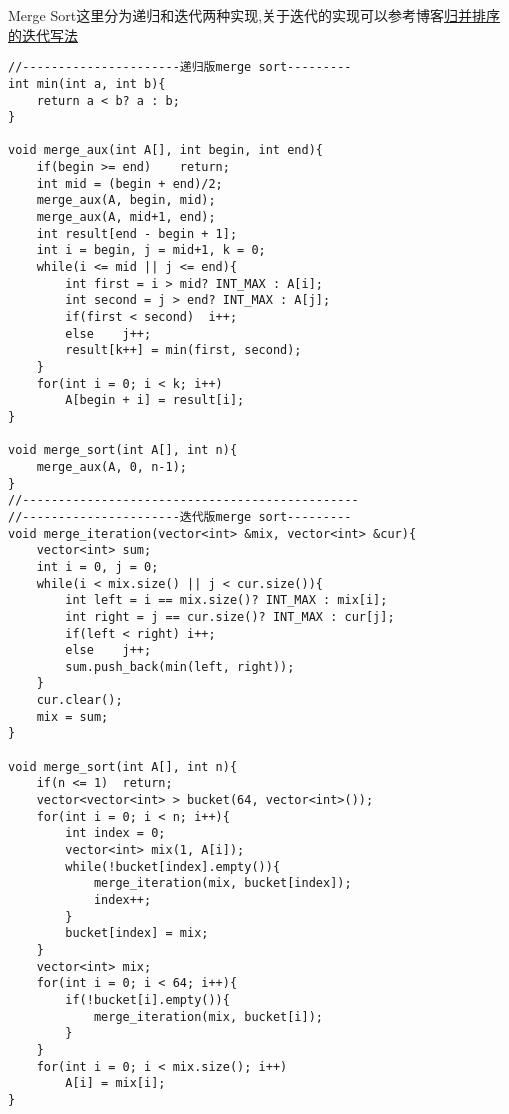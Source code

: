 \qquad Merge Sort这里分为递归和迭代两种实现,关于迭代的实现可以参考博客\href{https://sosohu.github.io/algorithm/2015/04/14/%E5%BD%92%E5%B9%B6%E6%8E%92%E5%BA%8F%E7%9A%84%E8%BF%AD%E4%BB%A3%E5%86%99%E6%B3%95.html}{归并排序的迭代写法}    
\begin{lstlisting}
//----------------------递归版merge sort---------
int min(int a, int b){
	return a < b? a : b;
}

void merge_aux(int A[], int begin, int end){
	if(begin >= end)	return;
	int mid = (begin + end)/2;
	merge_aux(A, begin, mid);
	merge_aux(A, mid+1, end);
	int result[end - begin + 1];
	int i = begin, j = mid+1, k = 0;
	while(i <= mid || j <= end){
		int first = i > mid? INT_MAX : A[i];
		int second = j > end? INT_MAX : A[j];
		if(first < second)	i++;
		else	j++;
		result[k++] = min(first, second);
	}
	for(int i = 0; i < k; i++)
		A[begin + i] = result[i];
}

void merge_sort(int A[], int n){
	merge_aux(A, 0, n-1);
}
//-----------------------------------------------
//----------------------迭代版merge sort---------
void merge_iteration(vector<int> &mix, vector<int> &cur){
	vector<int> sum;
	int i = 0, j = 0;
	while(i < mix.size() || j < cur.size()){
		int left = i == mix.size()? INT_MAX : mix[i];
		int right = j == cur.size()? INT_MAX : cur[j];
		if(left < right) i++;
		else	j++;
		sum.push_back(min(left, right));
	}
	cur.clear();
	mix = sum;
}

void merge_sort(int A[], int n){
	if(n <= 1)	return;
	vector<vector<int> > bucket(64, vector<int>());
	for(int i = 0; i < n; i++){
		int index = 0;
		vector<int> mix(1, A[i]);
		while(!bucket[index].empty()){
			merge_iteration(mix, bucket[index]);
			index++;
		}
		bucket[index] = mix;
	}
	vector<int> mix;
	for(int i = 0; i < 64; i++){
		if(!bucket[i].empty()){
			merge_iteration(mix, bucket[i]);
		}
	}
	for(int i = 0; i < mix.size(); i++)
		A[i] = mix[i];
}
\end{lstlisting}
